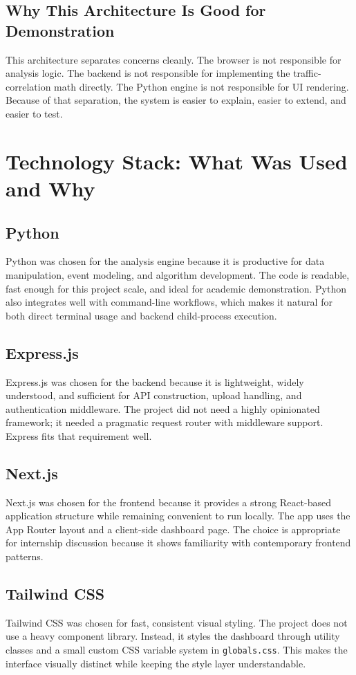 \documentclass[12pt,a4paper]{report}
\begin{document}
\section{Why This Architecture Is Good for Demonstration}
This architecture separates concerns cleanly. The browser is not responsible for analysis logic. The backend is not responsible for implementing the traffic-correlation math directly. The Python engine is not responsible for UI rendering. Because of that separation, the system is easier to explain, easier to extend, and easier to test.

\chapter{Technology Stack: What Was Used and Why}
\section{Python}
Python was chosen for the analysis engine because it is productive for data manipulation, event modeling, and algorithm development. The code is readable, fast enough for this project scale, and ideal for academic demonstration. Python also integrates well with command-line workflows, which makes it natural for both direct terminal usage and backend child-process execution.

\section{Express.js}
Express.js was chosen for the backend because it is lightweight, widely understood, and sufficient for API construction, upload handling, and authentication middleware. The project did not need a highly opinionated framework; it needed a pragmatic request router with middleware support. Express fits that requirement well.

\section{Next.js}
Next.js was chosen for the frontend because it provides a strong React-based application structure while remaining convenient to run locally. The app uses the App Router layout and a client-side dashboard page. The choice is appropriate for internship discussion because it shows familiarity with contemporary frontend patterns.

\section{Tailwind CSS}
Tailwind CSS was chosen for fast, consistent visual styling. The project does not use a heavy component library. Instead, it styles the dashboard through utility classes and a small custom CSS variable system in \texttt{globals.css}. This makes the interface visually distinct while keeping the style layer understandable.
\end{document}
